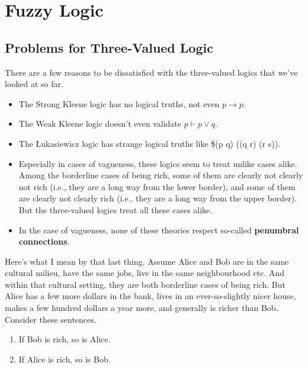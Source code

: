 \documentclass[
]{article}
\providecommand{\tightlist}{%
  \setlength{\itemsep}{0pt}\setlength{\parskip}{0pt}}\usepackage{longtable,booktabs,array}
\begin{document}
\hypertarget{fuzzy-logic}{%
\section{Fuzzy Logic}\label{fuzzy-logic}}

\hypertarget{problems-for-three-valued-logic}{%
\subsection{Problems for Three-Valued
Logic}\label{problems-for-three-valued-logic}}

There are a few reasons to be dissatisfied with the three-valued logics
that we've looked at so far.

\begin{itemize}
\tightlist
\item
  The Strong Kleene logic has no logical truths, not even
  \(p \rightarrow p\).
\item
  The Weak Kleene logic doesn't even validate \(p \vdash p \vee q\).
\item
  The Łukasiewicz logic has strange logical truths like \$(p
  \rightarrow q) \vee ((q \rightarrow r) \vee (r \rightarrow s)).
\item
  Especially in cases of vagueness, these logics seem to treat unlike
  cases alike. Among the borderline cases of being rich, some of them
  are clearly not clearly not rich (i.e., they are a long way from the
  lower border), and some of them are clearly not clearly rich (i.e.,
  they are a long way from the upper border). But the three-valued
  logics treat all these cases alike.
\item
  In the case of vagueness, none of these theories respect so-called
  \textbf{penumbral connections}.
\end{itemize}

Here's what I mean by that last thing. Assume Alice and Bob are in the
same cultural milieu, have the same jobs, live in the same neighbourhood
etc. And within that cultural setting, they are both borderline cases of
being rich. But Alice has a few more dollars in the bank, lives in an
ever-so-slightly nicer house, makes a few hundred dollars a year more,
and generally is richer than Bob. Consider these sentences.

\begin{enumerate}
\def\labelenumi{\arabic{enumi}.}
\tightlist
\item
  If Bob is rich, so is Alice.
\item
  If Alice is rich, so is Bob.
\end{enumerate}
\end{document}
